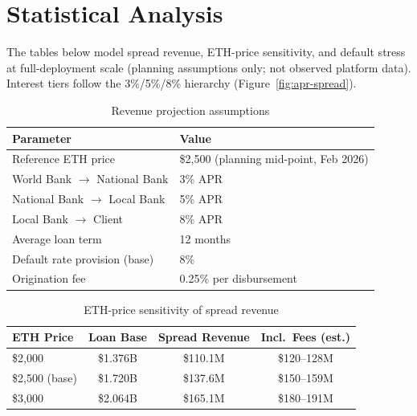 \documentclass[12pt, a4paper]{report}
\newcommand{\tableheadcolor}{\rowcolor{TableHeadBg}}
\newcommand{\tableheadfont}{\bfseries}
\begin{document}
\section{Statistical Analysis}
\label{sec:statistical-analysis}
\label{sec:interest-rates}

The tables below model spread revenue, ETH-price sensitivity, and default stress at full-deployment scale (planning assumptions only; not observed platform data). Interest tiers follow the 3\%/5\%/8\% hierarchy (Figure~\ref{fig:apr-spread}).

\begin{table}[H]
\centering
\caption[Revenue projection assumptions]{Revenue projection assumptions}
\label{tab:revenue-assumptions}
\begin{tabular}{p{6cm}p{7.5cm}}
\toprule
\tableheadcolor
\textbf{Parameter} & \textbf{Value} \\
\midrule
Reference ETH price & \$2{,}500 (planning mid-point, Feb 2026) \\
World Bank $\to$ National Bank & 3\% APR \\
National Bank $\to$ Local Bank & 5\% APR \\
Local Bank $\to$ Client & 8\% APR \\
Average loan term & 12 months \\
Default rate provision (base) & 8\% \\
Origination fee & 0.25\% per disbursement \\
\bottomrule
\end{tabular}
\end{table}

\vspace{2pt}

\begin{table}[H]
\centering
\caption[ETH-price sensitivity of spread revenue]{ETH-price sensitivity of spread revenue}
\begin{tabular}{@{}lccc@{}}
\toprule
\tableheadcolor
\tableheadfont ETH Price & \tableheadfont Loan Base & \tableheadfont Spread Revenue & \tableheadfont Incl.\ Fees (est.) \\
\midrule
\$2{,}000 & \$1.376B & \$110.1M & \$120--128M \\
\rowcolor{RowShade}
\$2{,}500 (base) & \$1.720B & \$137.6M & \$150--159M \\
\$3{,}000 & \$2.064B & \$165.1M & \$180--191M \\
\bottomrule
\end{tabular}
\end{table}
\end{document}
